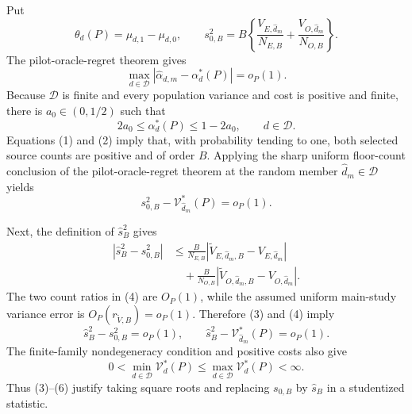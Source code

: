 Put
\[
 \theta_d(P)=\mu_{d,1}-\mu_{d,0},\qquad
 s_{0,B}^2
 =B\left\{\frac{V_{E,\widehat d_m}}{N_{E,B}}
          +\frac{V_{O,\widehat d_m}}{N_{O,B}}\right\}.
\]
The pilot-oracle-regret theorem gives
\[
 \max_{d\in\mathcal D}
 |\widehat\alpha_{d,m}-\alpha_d^*(P)|=o_P(1).                   \tag{1}
\]
Because \(\mathcal D\) is finite and every population variance and cost is positive and finite, there is \(a_0\in(0,1/2)\) such that
\[
 2a_0\le\alpha_d^*(P)\le1-2a_0,
 \qquad d\in\mathcal D.                                        \tag{2}
\]
Equations (1) and (2) imply that, with probability tending to one, both selected source counts are positive and of order \(B\).  Applying the sharp uniform floor-count conclusion of the pilot-oracle-regret theorem at the random member \(\widehat d_m\in\mathcal D\) yields
\[
 s_{0,B}^2-\mathcal V_{\widehat d_m}^*(P)=o_P(1).                \tag{3}
\]

Next, the definition of \(\widehat s_B^2\) gives
\[
\begin{aligned}
 |\widehat s_B^2-s_{0,B}^2|
 &\le \frac{B}{N_{E,B}}
       |\widetilde V_{E,\widehat d_m,B}-V_{E,\widehat d_m}|\\
 &\quad+\frac{B}{N_{O,B}}
       |\widetilde V_{O,\widehat d_m,B}-V_{O,\widehat d_m}|.
\end{aligned}                                                    \tag{4}
\]
The two count ratios in (4) are \(O_P(1)\), while the assumed uniform main-study variance error is \(O_P(r_{\widetilde V,B})=o_P(1)\).  Therefore (3) and (4) imply
\[
 \widehat s_B^2-s_{0,B}^2=o_P(1),\qquad
 \widehat s_B^2-\mathcal V_{\widehat d_m}^*(P)=o_P(1).          \tag{5}
\]
The finite-family nondegeneracy condition and positive costs also give
\[
 0<\min_{d\in\mathcal D}\mathcal V_d^*(P)
 \le\max_{d\in\mathcal D}\mathcal V_d^*(P)<\infty.           \tag{6}
\]
Thus (3)--(6) justify taking square roots and replacing \(s_{0,B}\) by \(\widehat s_B\) in a studentized statistic.

